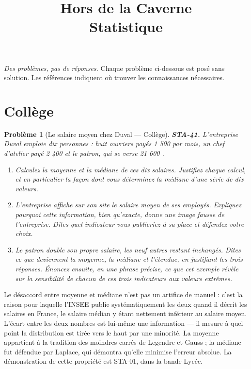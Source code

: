 \documentclass[11pt]{article}
\title{Hors de la Caverne \\ \Large Statistique}
\author{}
\date{}
\newtheorem{problem}{Problème}
\begin{document}
\maketitle
\noindent\emph{Des problèmes, pas de réponses.} Chaque problème ci-dessous est posé
sans solution. Les références indiquent où trouver les connaissances nécessaires.
\medskip


\section*{Collège}

\begin{problem}[{Le salaire moyen chez Duval --- Collège}]
\textbf{STA-41.} L'entreprise Duval emploie dix personnes : huit ouvriers payés 1 500 \texteuro{} par
mois, un chef d'atelier payé 2 400 \texteuro{} et le patron, qui se verse 21 600 \texteuro{}.
\begin{enumerate}
\item[(a)] Calculez la moyenne et la médiane de ces dix salaires. Justifiez chaque calcul, et en
particulier la façon dont vous déterminez la médiane d'une série de dix valeurs.
\item[(b)] L'entreprise affiche sur son site le salaire moyen de ses employés. Expliquez pourquoi cette
information, bien qu'exacte, donne une image fausse de l'entreprise. Dites quel indicateur vous
publieriez à sa place et défendez votre choix.
\item[(c)] Le patron double son propre salaire, les neuf autres restant inchangés. Dites ce que
deviennent la moyenne, la médiane et l'étendue, en justifiant les trois réponses. Énoncez ensuite,
en une phrase précise, ce que cet exemple révèle sur la sensibilité de chacun de ces trois
indicateurs aux valeurs extrêmes.
\end{enumerate}

\end{problem}

\noindent Le désaccord entre moyenne et médiane n'est pas un artifice de manuel : c'est la
raison pour laquelle l'INSEE publie systématiquement les deux quand il décrit les salaires en
France, le salaire médian y étant nettement inférieur au salaire moyen. L'écart entre les deux
nombres est lui-même une information --- il mesure à quel point la distribution est tirée vers le
haut par une minorité. La moyenne appartient à la tradition des moindres carrés de Legendre et
Gauss ; la médiane fut défendue par Laplace, qui démontra qu'elle minimise l'erreur absolue. La
démonstration de cette propriété est STA-01, dans la bande Lycée.
\end{document}
